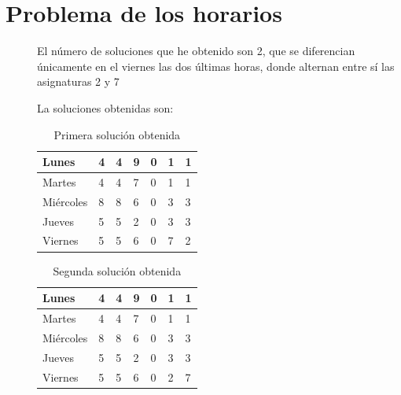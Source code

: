 \documentclass{article}
\begin{document}
\section {\large{Problema de los horarios}}
\begin{description}
  \item[\begin{tabular}{p{15cm}}{¿Cuál es el número de soluciones
    válidas obtenidas?}\end{tabular}]
    El número de soluciones que he obtenido son 2, que se diferencian únicamente en el viernes las dos 
    últimas horas, donde alternan entre sí las asignaturas 2 y 7

    La soluciones obtenidas son:
    \begin{table}[h]
      \begin{center}
        \begin{spacing}{1.5}
        \begin{tabular}{| l | l | l | l | l | l | l |}
          \hline
          Lunes & 4 & 4 & 9 & 0 & 1 & 1\\ \hline
          Martes & 4 & 4 & 7 & 0 & 1 & 1\\ \hline
          Miércoles & 8 & 8 & 6 & 0 & 3 & 3\\ \hline
          Jueves & 5 & 5 & 2 & 0 & 3 & 3\\ \hline
          Viernes & 5 & 5 & 6 & 0 & 7 & 2 \\ \hline
        \end{tabular}
        \end{spacing}
        \caption{Primera solución obtenida}
      \end{center}
    \end{table}

    \begin{table}[h]
      \begin{center}
        \begin{spacing}{1.5}
        \begin{tabular}{| l | l | l | l | l | l | l |}
          \hline
          Lunes & 4 & 4 & 9 & 0 & 1 & 1\\ \hline
          Martes & 4 & 4 & 7 & 0 & 1 & 1\\ \hline
          Miércoles & 8 & 8 & 6 & 0 & 3 & 3\\ \hline
          Jueves & 5 & 5 & 2 & 0 & 3 & 3\\ \hline
          Viernes & 5 & 5 & 6 & 0 & 2 & 7 \\ \hline
        \end{tabular}
        \end{spacing}
        \caption{Segunda solución obtenida}
      \end{center}
    \end{table}


\end{description}
\end{document}
